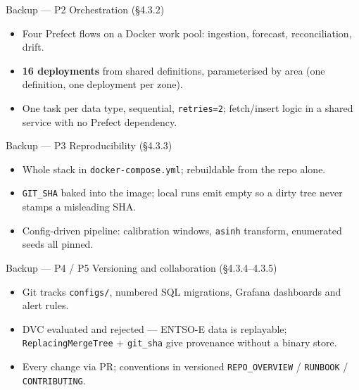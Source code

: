 \documentclass[aspectratio=169,10pt]{beamer}
\begin{document}
\begin{frame}{Backup --- P2 Orchestration \hfill\small(\S4.3.2)}
  \begin{itemize}\small
    \item Four Prefect flows on a Docker work pool: ingestion, forecast, reconciliation, drift.
    \item \textbf{16 deployments} from shared definitions, parameterised by area (one
      definition, one deployment per zone).
    \item One task per data type, sequential, \texttt{retries=2}; fetch/insert logic in a
      shared service with no Prefect dependency.
  \end{itemize}
\end{frame}

\begin{frame}{Backup --- P3 Reproducibility \hfill\small(\S4.3.3)}
  \begin{itemize}\small
    \item Whole stack in \texttt{docker-compose.yml}; rebuildable from the repo alone.
    \item \texttt{GIT\_SHA} baked into the image; local runs emit empty so a dirty tree
      never stamps a misleading SHA.
    \item Config-driven pipeline: calibration windows, \texttt{asinh} transform, enumerated
      seeds all pinned.
  \end{itemize}
\end{frame}

\begin{frame}{Backup --- P4 / P5 Versioning and collaboration \hfill\small(\S4.3.4--4.3.5)}
  \begin{itemize}\small
    \item Git tracks \texttt{configs/}, numbered SQL migrations, Grafana dashboards and
      alert rules.
    \item DVC evaluated and rejected --- ENTSO-E data is replayable; \texttt{ReplacingMergeTree}
      + \texttt{git\_sha} give provenance without a binary store.
    \item Every change via PR; conventions in versioned \texttt{REPO\_OVERVIEW} /
      \texttt{RUNBOOK} / \texttt{CONTRIBUTING}.
  \end{itemize}
\end{frame}
\end{document}
